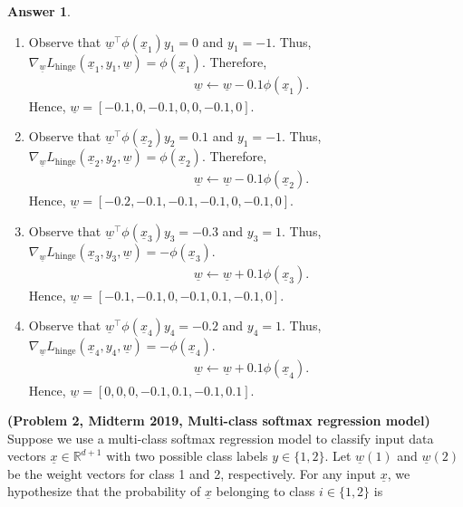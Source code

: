 \documentclass{article}
\theoremstyle{definition}
\newtheorem*{answer}{Answer}
\begin{document}
\begin{question}[start=0]
\begin{answer}
			\begin{enumerate}[label=\textbf{Step \arabic* (datapoint $\underline{x}_\arabic*$):}, itemindent=3.5cm]
				\item Observe that $\underline{w}^\top\phi(\underline{x}_1)y_1=0$ and $y_1=-1$. Thus,  $\nabla_{\underline{w}} L_{\text{hinge}}(\underline{x}_1, y_1, \underline{w}) = \phi(\underline{x}_1)$. Therefore, 
				\begin{align*}
						&\underline{w} \leftarrow \underline{w} - 0.1 \phi(\underline{x}_1).
					\end{align*}
				Hence, $\underline{w}=[-0.1, 0, -0.1, 0, 0, -0.1, 0]$.
				\item Observe that $\underline{w}^\top\phi(\underline{x}_2)y_2=0.1$ and $y_1=-1$. Thus, $\nabla_{\underline{w}} L_{\text{hinge}}(\underline{x}_2, y_2, \underline{w}) = \phi(\underline{x}_2)$. Therefore,
				\begin{align*}
					&\underline{w} \leftarrow \underline{w} - 0.1 \phi(\underline{x}_2).
				\end{align*}
				Hence, $\underline{w}=[-0.2, -0.1, -0.1, -0.1, 0, -0.1, 0]$.
				\item Observe that $\underline{w}^\top\phi(\underline{x}_3)y_3= -0.3$ and $y_3=1$. Thus, $\nabla_{\underline{w}} L_{\text{hinge}}(\underline{x}_3, y_3, \underline{w}) = -\phi(\underline{x}_3)$. \begin{align*}
						&\underline{w} \leftarrow \underline{w} + 0.1\phi(\underline{x}_3).
					\end{align*}
				Hence, $\underline{w}=[-0.1, -0.1, 0, -0.1, 0.1, -0.1, 0]$.
				\item Observe that $\underline{w}^\top\phi(\underline{x}_4)y_4= -0.2$ and $y_4=1$. Thus, $\nabla_{\underline{w}} L_{\text{hinge}}(\underline{x}_4, y_4, \underline{w}) = -\phi(\underline{x}_4)$. \begin{align*}
						&\underline{w} \leftarrow \underline{w} + 0.1 \phi(\underline{x}_4).
					\end{align*}
				Hence, $\underline{w}=[0, 0, 0, -0.1, 0.1, -0.1, 0.1]$.
			\end{enumerate}
			\end{answer}
	\item \textbf{(Problem 2, Midterm 2019, Multi-class softmax regression model)}
	Suppose we use a multi-class softmax regression model to classify input data vectors $\underline{x} \in \mathbb{R}^{d+1}$ with two possible class labels $y \in \{1, 2\}$. Let $\underline{w}(1)$ and $\underline{w}(2)$ be the weight vectors for class 1 and 2, respectively. For any input $\underline{x}$, we hypothesize that the probability of $\underline{x}$ belonging to class $i \in \{1, 2\}$ is

\end{question}
\end{document}
